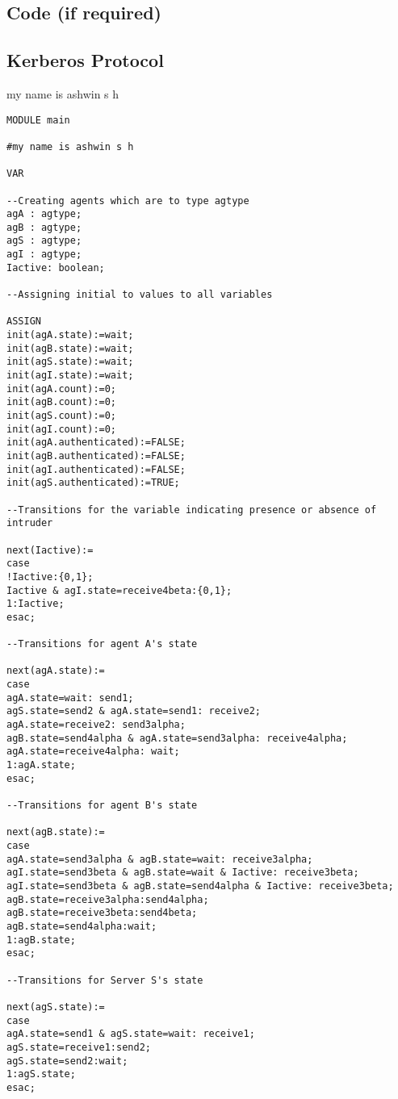 \begin{appendix}

\chapter{Code (if required)}
\section{Kerberos Protocol}
my name is ashwin s h
\scriptsize{
\begin{verbatim}
MODULE main

#my name is ashwin s h

VAR

--Creating agents which are to type agtype
agA : agtype; 
agB : agtype;
agS : agtype;
agI : agtype;
Iactive: boolean;

--Assigning initial to values to all variables

ASSIGN
init(agA.state):=wait;
init(agB.state):=wait;
init(agS.state):=wait;
init(agI.state):=wait;
init(agA.count):=0;
init(agB.count):=0;
init(agS.count):=0;
init(agI.count):=0;
init(agA.authenticated):=FALSE;
init(agB.authenticated):=FALSE;
init(agI.authenticated):=FALSE;
init(agS.authenticated):=TRUE;

--Transitions for the variable indicating presence or absence of intruder

next(Iactive):=
case
!Iactive:{0,1};
Iactive & agI.state=receive4beta:{0,1};
1:Iactive;
esac;

--Transitions for agent A's state

next(agA.state):=
case
agA.state=wait: send1;
agS.state=send2 & agA.state=send1: receive2;
agA.state=receive2: send3alpha;
agB.state=send4alpha & agA.state=send3alpha: receive4alpha;
agA.state=receive4alpha: wait;
1:agA.state;
esac;

--Transitions for agent B's state

next(agB.state):=
case
agA.state=send3alpha & agB.state=wait: receive3alpha;
agI.state=send3beta & agB.state=wait & Iactive: receive3beta;
agI.state=send3beta & agB.state=send4alpha & Iactive: receive3beta;
agB.state=receive3alpha:send4alpha;
agB.state=receive3beta:send4beta;
agB.state=send4alpha:wait;
1:agB.state;
esac;

--Transitions for Server S's state

next(agS.state):=
case
agA.state=send1 & agS.state=wait: receive1;
agS.state=receive1:send2;
agS.state=send2:wait;
1:agS.state;
esac;


\end{verbatim}}
\end{appendix}
